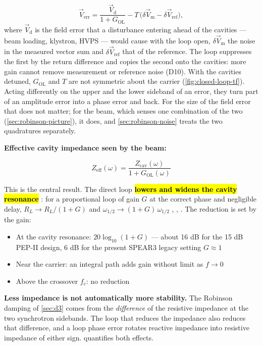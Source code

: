 \begin{equation}\label{eq:rejection}
\vec{V}_\text{err} = \frac{\vec{V}_\text{d}}{1 + G_\text{OL}} - T\,\bigl(\delta\vec{V}_\text{m} - \delta\vec{V}_\text{ref}\bigr),
\end{equation}
where \(\vec{V}_\text{d}\) is the field error that a disturbance entering ahead of the cavities --- beam loading, klystron, HVPS --- would cause with the loop open, \(\delta\vec{V}_\text{m}\) the noise in the measured vector sum and \(\delta\vec{V}_\text{ref}\) that of the reference. The loop suppresses the first by the return difference and copies the second onto the cavities: more gain cannot remove measurement or reference noise (D10). With the cavities detuned, \(G_\text{OL}\) and \(T\) are not symmetric about the carrier (\cref{fig:closed-loop-tf}). Acting differently on the upper and the lower sideband of an error, they turn part of an amplitude error into a phase error and back. For the size of the field error that does not matter; for the beam, which senses one combination of the two (\cref{sec:robinson-picture}), it does, and \cref{sec:robinson-noise} treats the two quadratures separately.

\textbf{Effective cavity impedance seen by the beam:}

\begin{equation}\label{eq:zeff}
Z_\text{eff}(\omega) = \frac{Z_\text{cav}(\omega)}{1 + G_\text{OL}(\omega)}
\end{equation}

This is the central result. The direct loop \hl{ \textbf{lowers and widens the cavity resonance} }: for a proportional loop of gain \(G\) at the correct phase and negligible delay, \(R_L \to R_L/(1+G)\) and \(\omega_{1/2} \to (1+G)\,\omega_{1/2}\) , , . The reduction is set by the gain:

\begin{itemize}
\tightlist
\item
  At the cavity resonance: \(20\log_{10}(1+G)\) --- about 16 dB for the 15 dB PEP-II design, 6 dB for the present SPEAR3 legacy setting \(G \approx 1\)
\item
  Near the carrier: an integral path adds gain without limit as \(f \to 0\)
\item
  Above the crossover \(f_c\): no reduction
\end{itemize}

\begin{keynote}
\textbf{Less impedance is not automatically more stability.} The Robinson damping of \cref{sec:d3} comes from the \emph{difference} of the resistive impedance at the two synchrotron sidebands. The loop that reduces the impedance also reduces that difference, and a loop phase error rotates reactive impedance into resistive impedance of either sign.  quantifies both effects.
\end{keynote}

